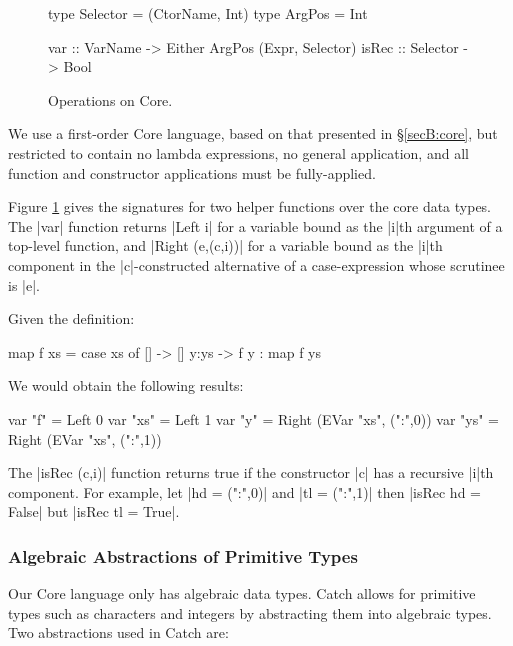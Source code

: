 \begin{figure}
\begin{code}
type Selector  =  (CtorName, Int)
type ArgPos    =  Int

var    :: VarName   -> Either ArgPos (Expr, Selector)
isRec  :: Selector  -> Bool
\end{code}
\caption{Operations on Core.}
\label{figC:catch_core_operations}
\end{figure}

We use a first-order Core language, based on that presented in \S\ref{secB:core}, but restricted to contain no lambda expressions, no general application, and all function and constructor applications must be fully-applied.

Figure \ref{figC:catch_core_operations} gives the signatures for two helper functions over the core data types. The |var| function returns |Left i| for a variable bound as the |i|th argument of a top-level function, and |Right (e,(c,i))| for a variable bound as the |i|th component in the |c|-constructed alternative of a case-expression whose scrutinee is |e|.

\begin{example}
Given the definition:

\begin{code}
map f xs = case  xs of
                 []    -> []
                 y:ys  -> f y : map f ys
\end{code}

We would obtain the following results:

\begin{code}
var "f"   = Left 0
var "xs"  = Left 1
var "y"   = Right (EVar "xs", (":",0))
var "ys"  = Right (EVar "xs", (":",1))
\end{code}
\end{example}

The |isRec (c,i)| function returns true if the constructor |c| has a recursive |i|th component. For example, let |hd = (":",0)| and |tl = (":",1)| then |isRec hd = False| but |isRec tl = True|.

\subsubsection{Algebraic Abstractions of Primitive Types}
\label{secC:abstraction}

Our Core language only has algebraic data types. Catch allows for primitive types such as characters and integers by abstracting them into algebraic types. Two abstractions used in Catch are:

